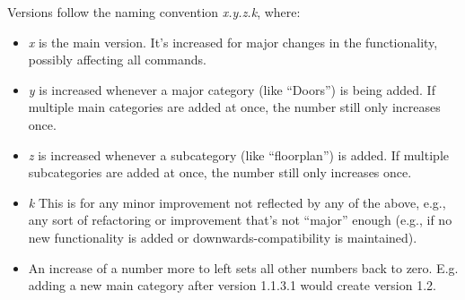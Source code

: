 \documentclass{article}
\begin{document}
Versions follow the naming convention \emph{x.y.z.k}, where:
\begin{itemize}
  \setlength{\parskip}{3pt}
  \item \emph{x} is the main version. It's increased for major changes in the functionality, possibly affecting all commands.
  \item \emph{y} is increased whenever a major category (like ``Doors'') is being added. If multiple main categories are added at once, the number still only increases once.
  \item \emph{z} is increased whenever a subcategory (like ``floorplan'') is added. If multiple subcategories are added at once, the number still only increases once. 
  \item \emph{k} This is for any minor improvement not reflected by any of the above, e.g., any sort of refactoring or improvement that's not ``major'' enough (e.g., if no new functionality is added or downwards-compatibility is maintained). 
  \item An increase of a number more to left sets all other numbers back to zero. E.g. adding a new main category after version 1.1.3.1 would create version 1.2.
\end{itemize}
\end{document}
